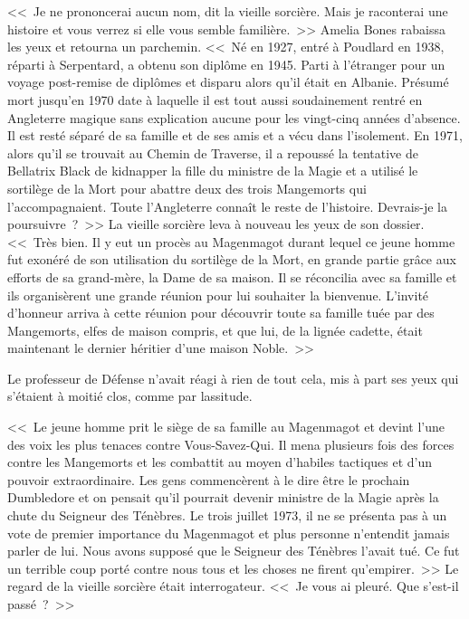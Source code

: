 <<~Je ne prononcerai aucun nom, dit la vieille sorcière. Mais je raconterai une histoire et vous verrez si elle vous semble familière.~>> Amelia Bones rabaissa les yeux et retourna un parchemin. <<~Né en 1927, entré à Poudlard en 1938, réparti à Serpentard, a obtenu son diplôme en 1945. Parti à l'étranger pour un voyage post-remise de diplômes et disparu alors qu'il était en Albanie. Présumé mort jusqu'en 1970 date à laquelle il est tout aussi soudainement rentré en Angleterre magique sans explication aucune pour les vingt-cinq années d'absence. Il est resté séparé de sa famille et de ses amis et a vécu dans l'isolement. En 1971, alors qu'il se trouvait au Chemin de Traverse, il a repoussé la tentative de Bellatrix Black de kidnapper la fille du ministre de la Magie et a utilisé le sortilège de la Mort pour abattre deux des trois Mangemorts qui l'accompagnaient. Toute l'Angleterre connaît le reste de l'histoire. Devrais-je la poursuivre~?~>> La vieille sorcière leva à nouveau les yeux de son dossier. <<~Très bien. Il y eut un procès au Magenmagot durant lequel ce jeune homme fut exonéré de son utilisation du sortilège de la Mort, en grande partie grâce aux efforts de sa grand-mère, la Dame de sa maison. Il se réconcilia avec sa famille et ils organisèrent une grande réunion pour lui souhaiter la bienvenue. L'invité d'honneur arriva à cette réunion pour découvrir toute sa famille tuée par des Mangemorts, elfes de maison compris, et que lui, de la lignée cadette, était maintenant le dernier héritier d'une maison Noble.~>>

Le professeur de Défense n'avait réagi à rien de tout cela, mis à part ses yeux qui s'étaient à moitié clos, comme par lassitude.

<<~Le jeune homme prit le siège de sa famille au Magenmagot et devint l'une des voix les plus tenaces contre Vous-Savez-Qui. Il mena plusieurs fois des forces contre les Mangemorts et les combattit au moyen d'habiles tactiques et d'un pouvoir extraordinaire. Les gens commencèrent à le dire être le prochain Dumbledore et on pensait qu'il pourrait devenir ministre de la Magie après la chute du Seigneur des Ténèbres. Le trois juillet 1973, il ne se présenta pas à un vote de premier importance du Magenmagot et plus personne n'entendit jamais parler de lui. Nous avons supposé que le Seigneur des Ténèbres l'avait tué. Ce fut un terrible coup porté contre nous tous et les choses ne firent qu'empirer.~>> Le regard de la vieille sorcière était interrogateur. <<~Je vous ai pleuré. Que s'est-il passé~?~>>

